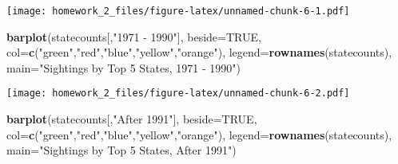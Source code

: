\documentclass[
]{article}
\newenvironment{Shaded}{\begin{snugshade}}{\end{snugshade}}
\newcommand{\CommentTok}[1]{\textcolor[rgb]{0.56,0.35,0.01}{\textit{#1}}}
\newcommand{\DataTypeTok}[1]{\textcolor[rgb]{0.13,0.29,0.53}{#1}}
\newcommand{\KeywordTok}[1]{\textcolor[rgb]{0.13,0.29,0.53}{\textbf{#1}}}
\newcommand{\NormalTok}[1]{#1}
\newcommand{\OperatorTok}[1]{\textcolor[rgb]{0.81,0.36,0.00}{\textbf{#1}}}
\newcommand{\OtherTok}[1]{\textcolor[rgb]{0.56,0.35,0.01}{#1}}
\newcommand{\StringTok}[1]{\textcolor[rgb]{0.31,0.60,0.02}{#1}}
\begin{document}
\begin{Shaded}
\end{Shaded}

\texttt{[image: homework\_2\_files/figure-latex/unnamed-chunk-6-1.pdf]}

\begin{Shaded}
\begin{Highlighting}[]
\KeywordTok{barplot}\NormalTok{(statecounts[,}\StringTok{"1971 - 1990"}\NormalTok{], }\DataTypeTok{beside=}\OtherTok{TRUE}\NormalTok{, }\DataTypeTok{col=}\KeywordTok{c}\NormalTok{(}\StringTok{"green"}\NormalTok{,}\StringTok{"red"}\NormalTok{,}\StringTok{"blue"}\NormalTok{,}\StringTok{"yellow"}\NormalTok{,}\StringTok{"orange"}\NormalTok{),}
        \DataTypeTok{legend=}\KeywordTok{rownames}\NormalTok{(statecounts), }\DataTypeTok{main=}\StringTok{"Sightings by Top 5 States, 1971 - 1990"}\NormalTok{)}
\end{Highlighting}
\end{Shaded}

\texttt{[image: homework\_2\_files/figure-latex/unnamed-chunk-6-2.pdf]}

\begin{Shaded}
\begin{Highlighting}[]
\KeywordTok{barplot}\NormalTok{(statecounts[,}\StringTok{"After 1991"}\NormalTok{], }\DataTypeTok{beside=}\OtherTok{TRUE}\NormalTok{, }\DataTypeTok{col=}\KeywordTok{c}\NormalTok{(}\StringTok{"green"}\NormalTok{,}\StringTok{"red"}\NormalTok{,}\StringTok{"blue"}\NormalTok{,}\StringTok{"yellow"}\NormalTok{,}\StringTok{"orange"}\NormalTok{),}
        \DataTypeTok{legend=}\KeywordTok{rownames}\NormalTok{(statecounts), }\DataTypeTok{main=}\StringTok{"Sightings by Top 5 States, After 1991"}\NormalTok{)}
\end{Highlighting}
\end{Shaded}
\end{document}
